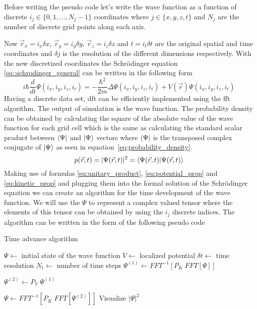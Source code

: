 Before writing the pseudo code let's write the wave function as a function of discrete $i_j \in \{0, 1, \dots, N_j - 1\}$ coordinates where $j \in \{x, y, z, t\}$ and $N_j$ are the number of discrete grid points along each axis.

Now $\vec{r}_x = i_x \delta x$, $\vec{r}_y = i_y \delta y$, $\vec{r}_z = i_z \delta z$ and $t = i_t \delta t$ are the original spatial and time coordinates and $\delta j$ is the resolution of the different dimensions respectively.
With the new discretized coordinates the Schrödinger equation \ref{eq::schrodinger_general} can be written in the following form
\begin{equation}
	\label{eq:discretized_schrodinger}		
	i \hbar \frac{d}{dt}\Psi(i_x, i_y, i_z, i_t) = - \frac{\hbar^2}{2m}\Delta\Psi(i_x, i_y, i_z, i_t) + V(\vec{r})\Psi(i_x, i_y, i_z, i_t)
\end{equation}
Having a discrete data set, \acrfull{dft} can be efficiently implemented using the \acrfull{fft} algorithm.
The output of simulation is the wave function.
The probability density can be obtained by calculating the square of the absolute value of the wave function for each grid cell which is the same as calculating the standard scalar product between $\bra{\Psi}$ and $\ket{\Psi}$ vectors where $\bra{\Psi}$ is the transposed complex conjugate of $\ket{\Psi}$ as seen in equation~\ref{eq:probability_density}.
\begin{equation}
	\label{eq:probability_density}
	p(\vec{r}, t) = |\Psi(\vec{r}, t)|^2 = \braket{\Psi(\vec{r}, t)}
\end{equation}
Making use of formulas \ref{eq:unitary_product}, \ref{eq:potential_prop} and \ref{eq:kinetic_prop} and plugging them into the formal solution of the Schrödinger equation we can create an algorithm for the time development of the wave function.
We will use the $\Psi$ to represent a complex valued tensor where the elements of this tensor can be obtained by using the $i_j$ discrete indices.
The algorithm can be written in the form of the following pseudo code

\begin{algorithm}
	\caption{Time advance algorithm}\label{alg:time_advance}
	\begin{algorithmic}
		\State $ \Psi \gets $ initial state of the wave function
		\State $ V \gets $ localized potential
		\State $ \delta t \gets $ time resolution
		\State $ N_t \gets $ number of time steps
		\For{$i \in [0, N_t)$}
			\State $\Psi^{(1)} \gets FFT^{-1}
			\left[
			P_K\; FFT\left[ \Psi \right]
			\right]
			$
			
			\State $\Psi^{(2)} \gets P_V\; \Psi^{(1)}$
			
			\State $\Psi \gets FFT^{-1}
			\left[
			P_K\; FFT\left[ \Psi^{(2)} \right]
			\right]
			$
			\State Visualize $|\Psi|^2$
		\EndFor
	\end{algorithmic}
\end{algorithm}

